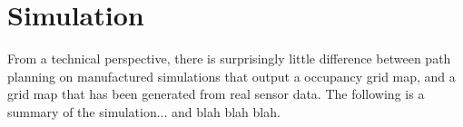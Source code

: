 \section{Simulation}

From a technical perspective, there is surprisingly little difference between path planning on manufactured simulations that output a occupancy grid map, and a grid map that has been generated from real sensor data. The following is a summary of the simulation... and blah blah blah. 
